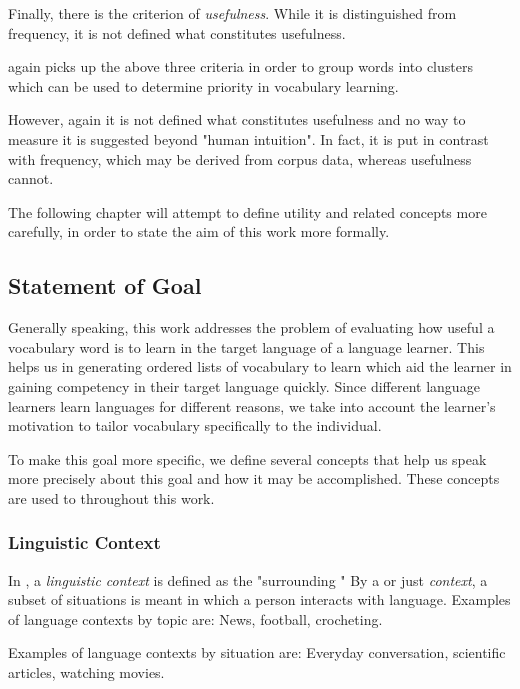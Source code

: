 Finally, there is the criterion of \textit{usefulness}.
While it is distinguished from frequency, it is not defined what constitutes usefulness.

 again picks up the above three criteria in order to group words into clusters which can be used to determine priority in vocabulary learning.

However, again it is not defined what constitutes usefulness and no way to measure it is suggested beyond "human intuition".
In fact, it is put in contrast with frequency, which may be derived from corpus data, whereas usefulness cannot.

The following chapter will attempt to define utility and related concepts more carefully, in order to state the aim of this work more formally.

\subsection{Statement of Goal} \label{sec:statement-of-goal}

Generally speaking, this work addresses the problem of evaluating how useful a vocabulary word is to learn in the target language of a language learner.
This helps us in generating ordered lists of vocabulary to learn which aid the learner in gaining competency in their target language quickly.
Since different language learners learn languages for different reasons, we take into account the learner's motivation to tailor vocabulary specifically to the individual.

To make this goal more specific, we define several concepts that help us speak more precisely about this goal and how it may be accomplished.
These concepts are used to throughout this work.

\subsubsection{Linguistic Context}
In , a \textit{linguistic context} is defined as the "surrounding "
By a  or just \textit{context}, a subset of situations is meant in which a person interacts with language.
Examples of language contexts by topic are:
News, football, crocheting.

Examples of language contexts by situation are:
Everyday conversation, scientific articles, watching movies.

